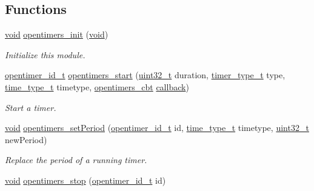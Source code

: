 \subsection*{Functions}
\begin{DoxyCompactItemize}
\item 
\hyperlink{usb__devapi_8h_afabf60e7f57651d6d595a02c75f07cd0}{void} \hyperlink{group___open_timers_gaf3d3dd8b046f104fd2fc8c3ccc31a80c}{opentimers\+\_\+init} (\hyperlink{usb__devapi_8h_afabf60e7f57651d6d595a02c75f07cd0}{void})
\begin{DoxyCompactList}\small\item\em Initialize this module. \end{DoxyCompactList}\item 
\hyperlink{group___open_timers_gae5ca9e65d270cdfa4bc74008d96d69ab}{opentimer\+\_\+id\+\_\+t} \hyperlink{group___open_timers_gaa66975435aec29368f203e1c07218a0d}{opentimers\+\_\+start} (\hyperlink{_p_e___types_8h_a33594304e786b158f3fb30289278f5af}{uint32\+\_\+t} duration, \hyperlink{group___open_timers_ga66e6b1d10289945ae9284d769f136e59}{timer\+\_\+type\+\_\+t} type, \hyperlink{group___open_timers_gad4702b7e72b77cd1d6cf3a63c0db9df8}{time\+\_\+type\+\_\+t} timetype, \hyperlink{group___open_timers_ga93a6f1f7e03cd8ad88cbd9509db173cf}{opentimers\+\_\+cbt} \hyperlink{k20_2bsp_2sctimer_8c_a5771d3f574543a9990943a0fcb713929}{callback})
\begin{DoxyCompactList}\small\item\em Start a timer. \end{DoxyCompactList}\item 
\hyperlink{usb__devapi_8h_afabf60e7f57651d6d595a02c75f07cd0}{void} \hyperlink{group___open_timers_gac160b81d1e558b7b11c95fe419ecf3ed}{opentimers\+\_\+set\+Period} (\hyperlink{group___open_timers_gae5ca9e65d270cdfa4bc74008d96d69ab}{opentimer\+\_\+id\+\_\+t} id, \hyperlink{group___open_timers_gad4702b7e72b77cd1d6cf3a63c0db9df8}{time\+\_\+type\+\_\+t} timetype, \hyperlink{_p_e___types_8h_a33594304e786b158f3fb30289278f5af}{uint32\+\_\+t} new\+Period)
\begin{DoxyCompactList}\small\item\em Replace the period of a running timer. \end{DoxyCompactList}\item 
\hyperlink{usb__devapi_8h_afabf60e7f57651d6d595a02c75f07cd0}{void} \hyperlink{group___open_timers_ga1310b613ecc237238624df341c71bb7d}{opentimers\+\_\+stop} (\hyperlink{group___open_timers_gae5ca9e65d270cdfa4bc74008d96d69ab}{opentimer\+\_\+id\+\_\+t} id)

\end{DoxyCompactItemize}
